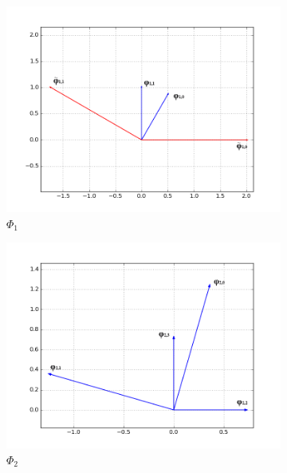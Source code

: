 \begin{enumerate}[(a)]
\begin{figure}[htbp]
	\centering
	\begin{subfigure}[b]{0.49\textwidth}
		\includegraphics[width=\textwidth,trim={0.5in 0.5in 0.5in 0.5in},clip]{images/phi1}
		\caption{$\Phi_1$}
	\end{subfigure}
	\begin{subfigure}[b]{0.49\textwidth}
		\includegraphics[width=\textwidth,trim={0.5in 0.5in 0.5in 0.5in},clip]{images/phi2}
		\caption{$\Phi_2$}
	\end{subfigure}
	\\
	\begin{subfigure}[b]{0.49\textwidth}

\end{subfigure}
\end{figure}
\end{enumerate}
